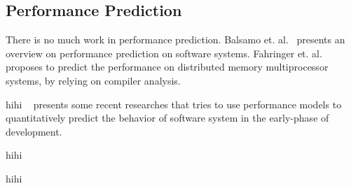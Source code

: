 


\subsection{Performance Prediction}

There is no much work in performance prediction. Balsamo et. al.~\cite{Balsamo:2004:MPP:987527.987640} presents an overview on performance prediction on software systems. 
Fahringer et. al. proposes to predict the performance on distributed memory multiprocessor systems, by relying on compiler analysis. 

hihi ~\cite{Balsamo:2004:MPP:987527.987640} presents some recent researches that tries to use performance models to quantitatively predict the behavior of software system in the early-phase of development. 

hihi ~\cite{impactofsharing}

hihi~\cite{Joao:2012:BIS:2150976.2151001} 



